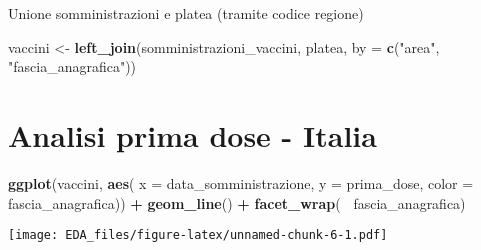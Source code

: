 \documentclass[]{article}
\newenvironment{Shaded}{\begin{snugshade}}{\end{snugshade}}
\newcommand{\KeywordTok}[1]{\textcolor[rgb]{0.13,0.29,0.53}{\textbf{#1}}}
\newcommand{\DataTypeTok}[1]{\textcolor[rgb]{0.13,0.29,0.53}{#1}}
\newcommand{\StringTok}[1]{\textcolor[rgb]{0.31,0.60,0.02}{#1}}
\newcommand{\OperatorTok}[1]{\textcolor[rgb]{0.81,0.36,0.00}{\textbf{#1}}}
\newcommand{\NormalTok}[1]{#1}
\begin{document}
Unione somministrazioni e platea (tramite codice regione)

\begin{Shaded}
\begin{Highlighting}[]
\NormalTok{vaccini <-}\StringTok{ }\KeywordTok{left_join}\NormalTok{(somministrazioni_vaccini, platea, }
                     \DataTypeTok{by =} \KeywordTok{c}\NormalTok{(}\StringTok{"area"}\NormalTok{, }\StringTok{"fascia_anagrafica"}\NormalTok{))}
\end{Highlighting}
\end{Shaded}

\section{Analisi prima dose - Italia}\label{analisi-prima-dose---italia}

\begin{Shaded}
\begin{Highlighting}[]
\KeywordTok{ggplot}\NormalTok{(vaccini, }
       \KeywordTok{aes}\NormalTok{( }\DataTypeTok{x =}\NormalTok{ data_somministrazione,}
            \DataTypeTok{y =}\NormalTok{ prima_dose,}
            \DataTypeTok{color =}\NormalTok{ fascia_anagrafica)) }\OperatorTok{+}
\StringTok{  }\KeywordTok{geom_line}\NormalTok{() }\OperatorTok{+}
\StringTok{  }\KeywordTok{facet_wrap}\NormalTok{( }\OperatorTok{~}\NormalTok{fascia_anagrafica)}
\end{Highlighting}
\end{Shaded}

\texttt{[image: EDA\_files/figure-latex/unnamed-chunk-6-1.pdf]}

\begin{Shaded}
\end{Shaded}
\end{document}
